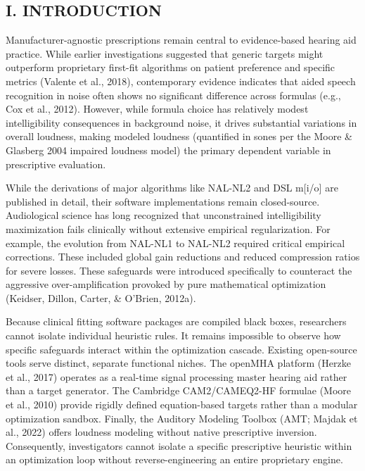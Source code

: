 \documentclass[
  12pt,
]{article}
\begin{document}
\subsection{I. INTRODUCTION}\label{i.-introduction}

Manufacturer-agnostic prescriptions remain central to evidence-based
hearing aid practice. While earlier investigations suggested that
generic targets might outperform proprietary first-fit algorithms on
patient preference and specific metrics (Valente et al., 2018),
contemporary evidence indicates that aided speech recognition in noise
often shows no significant difference across formulas (e.g., Cox et al.,
2012). However, while formula choice has relatively modest
intelligibility consequences in background noise, it drives substantial
variations in overall loudness, making modeled loudness (quantified in
sones per the Moore \& Glasberg 2004 impaired loudness model) the
primary dependent variable in prescriptive evaluation.

While the derivations of major algorithms like NAL-NL2 and DSL
m{[}i/o{]} are published in detail, their software implementations
remain closed-source. Audiological science has long recognized that
unconstrained intelligibility maximization fails clinically without
extensive empirical regularization. For example, the evolution from
NAL-NL1 to NAL-NL2 required critical empirical corrections. These
included global gain reductions and reduced compression ratios for
severe losses. These safeguards were introduced specifically to
counteract the aggressive over-amplification provoked by pure
mathematical optimization (Keidser, Dillon, Carter, \& O'Brien, 2012a).

Because clinical fitting software packages are compiled black boxes,
researchers cannot isolate individual heuristic rules. It remains
impossible to observe how specific safeguards interact within the
optimization cascade. Existing open-source tools serve distinct,
separate functional niches. The openMHA platform (Herzke et al., 2017)
operates as a real-time signal processing master hearing aid rather than
a target generator. The Cambridge CAM2/CAMEQ2-HF formulae (Moore et al.,
2010) provide rigidly defined equation-based targets rather than a
modular optimization sandbox. Finally, the Auditory Modeling Toolbox
(AMT; Majdak et al., 2022) offers loudness modeling without native
prescriptive inversion. Consequently, investigators cannot isolate a
specific prescriptive heuristic within an optimization loop without
reverse-engineering an entire proprietary engine.
\end{document}
